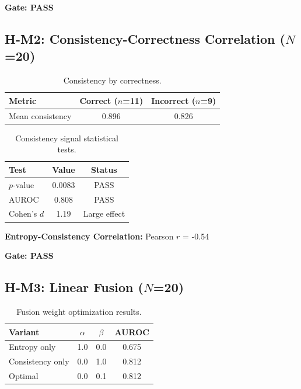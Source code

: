 \textbf{Gate: PASS}

\subsection{H-M2: Consistency-Correctness Correlation ($N$=20)}

\begin{table}[h]
\centering
\begin{tabular}{lcc}
\toprule
Metric & Correct ($n$=11) & Incorrect ($n$=9) \\
\midrule
Mean consistency & 0.896 & 0.826 \\
\bottomrule
\end{tabular}
\caption{Consistency by correctness.}
\label{tab:consistency}
\end{table}

\begin{table}[h]
\centering
\begin{tabular}{lcc}
\toprule
Test & Value & Status \\
\midrule
$p$-value & 0.0083 & PASS \\
AUROC & 0.808 & PASS \\
Cohen's $d$ & 1.19 & Large effect \\
\bottomrule
\end{tabular}
\caption{Consistency signal statistical tests.}
\label{tab:consistency_stats}
\end{table}

\textbf{Entropy-Consistency Correlation:} Pearson $r$ = -0.54

\textbf{Gate: PASS}

\subsection{H-M3: Linear Fusion ($N$=20)}

\begin{table}[h]
\centering
\begin{tabular}{lccc}
\toprule
Variant & $\alpha$ & $\beta$ & AUROC \\
\midrule
Entropy only & 1.0 & 0.0 & 0.675 \\
Consistency only & 0.0 & 1.0 & 0.812 \\
Optimal & 0.0 & 0.1 & 0.812 \\
\bottomrule
\end{tabular}
\caption{Fusion weight optimization results.}
\label{tab:fusion}
\end{table}


